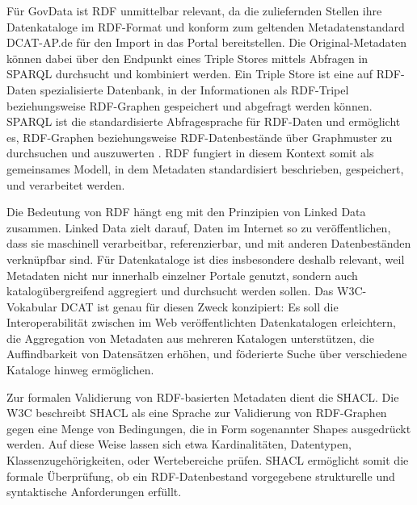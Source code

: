 Für GovData ist RDF unmittelbar relevant, da die zuliefernden Stellen ihre Datenkataloge im RDF-Format und konform zum geltenden Metadatenstandard DCAT-AP.de für den Import in das Portal bereitstellen.
Die Original-Metadaten können dabei über den Endpunkt eines Triple Stores mittels Abfragen in \acrfull{SPARQL} durchsucht und kombiniert werden.
Ein Triple Store ist eine auf RDF-Daten spezialisierte Datenbank, in der Informationen als RDF-Tripel beziehungsweise RDF-Graphen gespeichert und abgefragt werden können.
SPARQL ist die standardisierte Abfragesprache für RDF-Daten und ermöglicht es, RDF-Graphen beziehungsweise RDF-Datenbestände über Graphmuster zu durchsuchen und auszuwerten \cite{W3CRDF11Concepts,w3c_sparql11_query}.
RDF fungiert in diesem Kontext somit als gemeinsames Modell, in dem Metadaten standardisiert beschrieben, gespeichert, und verarbeitet werden.

Die Bedeutung von RDF hängt eng mit den Prinzipien von Linked Data zusammen. Linked Data zielt darauf, Daten im Internet so zu veröffentlichen, dass sie maschinell verarbeitbar, referenzierbar, und mit anderen Datenbeständen verknüpfbar sind. Für Datenkataloge ist dies insbesondere deshalb relevant, weil Metadaten nicht nur innerhalb einzelner Portale genutzt, sondern auch katalogübergreifend aggregiert und durchsucht werden sollen. Das W3C-Vokabular DCAT ist genau für diesen Zweck konzipiert: Es soll die Interoperabilität zwischen im Web veröffentlichten Datenkatalogen erleichtern, die Aggregation von Metadaten aus mehreren Katalogen unterstützen, die Auffindbarkeit von Datensätzen erhöhen, und föderierte Suche über verschiedene Kataloge hinweg ermöglichen. \cite{W3CDCAT3}

Zur formalen Validierung von RDF-basierten Metadaten dient die \acrfull{SHACL}.
Die W3C beschreibt SHACL als eine Sprache zur Validierung von RDF-Graphen gegen eine Menge von Bedingungen, die in Form sogenannter Shapes ausgedrückt werden.
Auf diese Weise lassen sich etwa Kardinalitäten, Datentypen, Klassenzugehörigkeiten, oder Wertebereiche prüfen.
SHACL ermöglicht somit die formale Überprüfung, ob ein RDF-Datenbestand vorgegebene strukturelle und syntaktische Anforderungen erfüllt. \cite{W3CSHACL}

